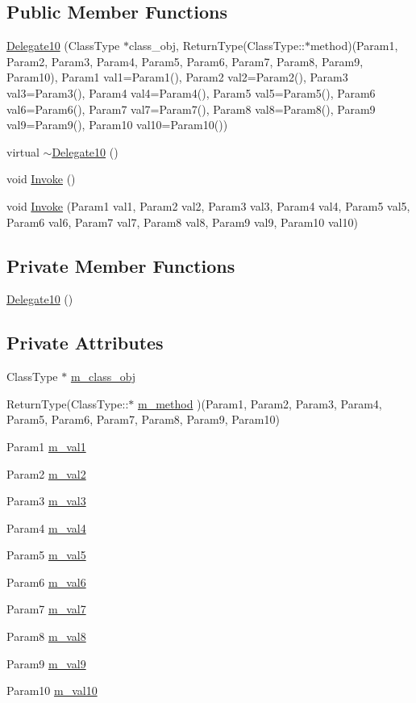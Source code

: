 \subsection*{Public Member Functions}
\begin{CompactItemize}
\item 
\hyperlink{classDL_1_1Delegate10_a0}{Delegate10} (Class\-Type $\ast$class\_\-obj, Return\-Type(Class\-Type::$\ast$method)(Param1, Param2, Param3, Param4, Param5, Param6, Param7, Param8, Param9, Param10), Param1 val1=Param1(), Param2 val2=Param2(), Param3 val3=Param3(), Param4 val4=Param4(), Param5 val5=Param5(), Param6 val6=Param6(), Param7 val7=Param7(), Param8 val8=Param8(), Param9 val9=Param9(), Param10 val10=Param10())
\item 
virtual \hyperlink{classDL_1_1Delegate10_a1}{$\sim$Delegate10} ()
\item 
void \hyperlink{classDL_1_1Delegate10_a2}{Invoke} ()
\item 
void \hyperlink{classDL_1_1Delegate10_a3}{Invoke} (Param1 val1, Param2 val2, Param3 val3, Param4 val4, Param5 val5, Param6 val6, Param7 val7, Param8 val8, Param9 val9, Param10 val10)
\end{CompactItemize}
\subsection*{Private Member Functions}
\begin{CompactItemize}
\item 
\hyperlink{classDL_1_1Delegate10_d0}{Delegate10} ()
\end{CompactItemize}
\subsection*{Private Attributes}
\begin{CompactItemize}
\item 
Class\-Type $\ast$ \hyperlink{classDL_1_1Delegate10_r0}{m\_\-class\_\-obj}
\item 
Return\-Type(Class\-Type::$\ast$ \hyperlink{classDL_1_1Delegate10_r1}{m\_\-method} )(Param1, Param2, Param3, Param4, Param5, Param6, Param7, Param8, Param9, Param10)
\item 
Param1 \hyperlink{classDL_1_1Delegate10_r2}{m\_\-val1}
\item 
Param2 \hyperlink{classDL_1_1Delegate10_r3}{m\_\-val2}
\item 
Param3 \hyperlink{classDL_1_1Delegate10_r4}{m\_\-val3}
\item 
Param4 \hyperlink{classDL_1_1Delegate10_r5}{m\_\-val4}
\item 
Param5 \hyperlink{classDL_1_1Delegate10_r6}{m\_\-val5}
\item 
Param6 \hyperlink{classDL_1_1Delegate10_r7}{m\_\-val6}
\item 
Param7 \hyperlink{classDL_1_1Delegate10_r8}{m\_\-val7}
\item 
Param8 \hyperlink{classDL_1_1Delegate10_r9}{m\_\-val8}
\item 
Param9 \hyperlink{classDL_1_1Delegate10_r10}{m\_\-val9}
\item 
Param10 \hyperlink{classDL_1_1Delegate10_r11}{m\_\-val10}
\end{CompactItemize}


